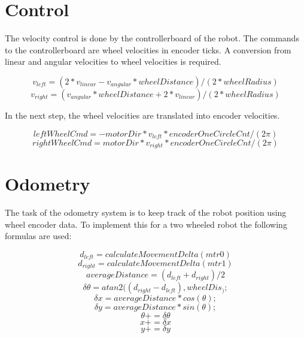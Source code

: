 \documentclass[a4paper]{article}
\begin{document}
\section{Control}
The velocity control is done by the controllerboard of the robot. The commands to
the controllerboard are wheel velocities in encoder ticks. A conversion from linear
and angular velocities to wheel velocities is required.

\begin{equation}
        v_{left} = (2 * v_{linear} - v_{angular} * wheelDistance) / (2 * wheelRadius)
\end{equation}
\begin{equation}
        v_{right} = (v_{angular} * wheelDistance + 2 * v_{linear}) / (2 * wheelRadius)
\end{equation}

In the next step, the wheel velocities are translated into encoder velocities.

\begin{equation}
  leftWheelCmd = -motorDir * v_{left} * encoderOneCircleCnt / (2 \pi)
\end{equation}
\begin{equation}
 rightWheelCmd = motorDir * v_{right} * encoderOneCircleCnt / (2 \pi)
\end{equation}

\section{Odometry}
The task of the odometry system is to keep track of the robot position using wheel encoder
data. To implement this for a two wheeled robot the following formulas are used:

\begin{equation}
 d_{left} = calculateMovementDelta(mtr0)
\end{equation}
\begin{equation}
 d_{right} = calculateMovementDelta(mtr1)
\end{equation}
\begin{equation}
 averageDistance = (d_{left} + d_{right}) / 2
\end{equation}
\begin{equation}
 \delta \theta = atan2((d_{right} - d_{left}), wheelDis_);
\end{equation}
\begin{equation}
 \delta x = averageDistance * cos(\theta);
\end{equation}
\begin{equation}
 \delta y = averageDistance * sin(\theta);
\end{equation}
\begin{equation}
 \theta += \delta \theta
\end{equation}
\begin{equation}
 x += \delta x
\end{equation}
\begin{equation}
 y += \delta y
\end{equation}
\end{document}
